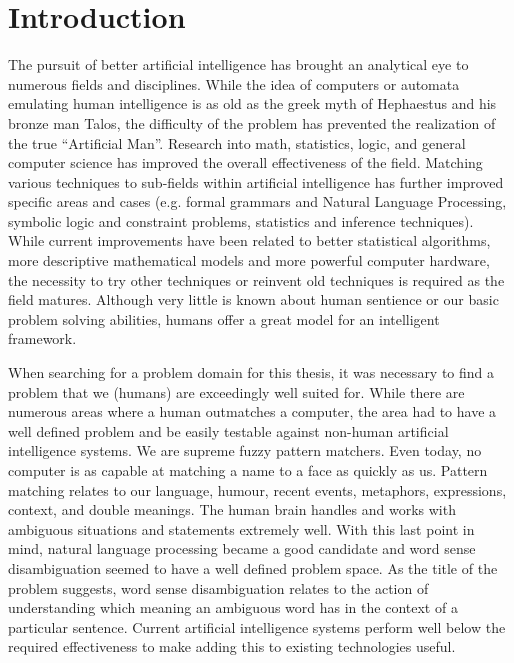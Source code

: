 \chapter{Introduction}

The pursuit of better artificial intelligence has brought an analytical eye to
numerous fields and disciplines.  While the idea of computers or automata
emulating human intelligence is as old as the greek myth of Hephaestus and his
bronze man Talos\cite{TALOS}, the difficulty of the problem has prevented the realization of the true ``Artificial Man''.  Research into math, statistics, logic, and general
computer science has improved the overall effectiveness of the field. Matching
various techniques to sub-fields within artificial intelligence has further
improved specific areas and cases (e.g. formal grammars and Natural Language
Processing, symbolic logic and constraint problems, statistics and inference
techniques). While current improvements have been related to better statistical
algorithms, more descriptive mathematical models and more powerful computer
hardware, the necessity to try other techniques or reinvent old techniques is
required as the field matures.  Although very little is known about human
sentience or our basic problem solving abilities, humans offer a great model for
an intelligent framework.

When searching for a problem domain for this thesis, it was necessary to find a
problem that we (humans) are exceedingly well suited for.  While there are
numerous areas where a human outmatches a computer, the area had to have a well
defined problem and be easily testable against non-human artificial intelligence
systems.  We are supreme fuzzy pattern matchers.  Even today, no computer is as
capable at matching a name to a face as quickly as us.  Pattern matching relates
to our language, humour, recent events, metaphors, expressions, context, and
double meanings. The human brain handles and works with ambiguous situations and
statements extremely well.  With this last point in mind, natural
language processing became a good candidate and word sense disambiguation seemed
to have a well defined problem space.  As the title of the problem suggests,
word sense disambiguation relates to the action of understanding which meaning
an ambiguous word has in the context of a particular sentence. Current
artificial intelligence systems perform well below the required effectiveness to
make adding this to existing technologies useful.

